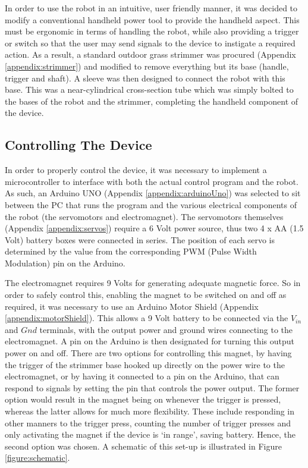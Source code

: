 \documentclass[11pt]{article}
\begin{document}
In order to use the robot in an intuitive, user friendly manner, it was decided to modify a conventional handheld power tool to provide the handheld aspect. This must be ergonomic in terms of handling the robot, while also providing a trigger or switch so that the user may send signals to the device to instigate a required action. As a result, a standard outdoor grass strimmer was procured (Appendix \ref{appendix:strimmer}) and modified to remove everything but its base (handle, trigger and shaft). A sleeve was then designed to connect the robot with this base. This was a near-cylindrical cross-section tube which was simply bolted to the bases of the robot and the strimmer, completing the handheld component of the device.


\pagebreak
\subsection{Controlling The Device}
\label{section:controllingTheDevice}

In order to properly control the device, it was necessary to implement a microcontroller to interface with both the actual control program and the robot. As such, an Arduino UNO (Appendix \ref{appendix:arduinoUno}) was selected to sit between the PC that runs the program and the various electrical components of the robot (the servomotors and electromagnet). The servomotors themselves (Appendix \ref{appendix:servos}) require a 6 Volt power source, thus two 4 x AA (1.5 Volt) battery boxes were connected in series. The position of each servo is determined by the value from the corresponding PWM (Pulse Width Modulation) pin on the Arduino. 

The electromagnet requires 9 Volts for generating adequate magnetic force. So in order to safely control this, enabling the magnet to be switched on and off as required, it was necessary to use an Arduino Motor Shield (Appendix \ref{appendix:motorShield}). This allows a 9 Volt battery to be connected via the $V_{in}$ and $Gnd$ terminals, with the output power and ground wires connecting to the electromagnet. A pin on the Arduino is then designated for turning this output power on and off. There are two options for controlling this magnet, by having the trigger of the strimmer base hooked up directly on the power wire to the electromagnet, or by having it connected to a pin on the Arduino, that can respond to signals by setting the pin that controls the power output. The former option would result in the magnet being on whenever the trigger is pressed, whereas the latter allows for much more flexibility. These include responding in other manners to the trigger press, counting the number of trigger presses and only activating the magnet if the device is `in range', saving battery. Hence, the second option was chosen. A schematic of this set-up is illustrated in Figure \ref{figure:schematic}.
\end{document}
